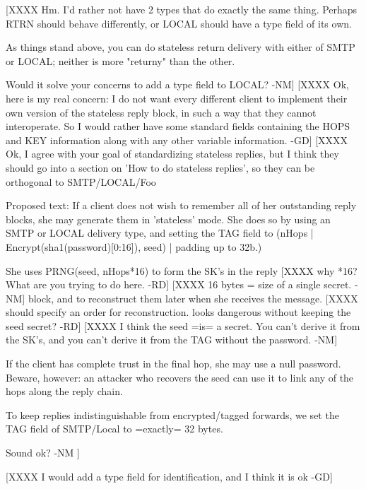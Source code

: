 [XXXX Hm.  I'd rather not have 2 types that do exactly the same thing.
      Perhaps RTRN should behave differently, or LOCAL should have a
      type field of its own.

      As things stand above, you can do stateless return delivery with
      either of SMTP or LOCAL; neither is more "returny" than the other.

      Would it solve your concerns to add a type field to LOCAL? -NM]
[XXXX Ok, here is my real concern: I do not want every different client
      to implement their own version of the stateless reply block, in
such a way that they cannot interoperate. So I would rather have some 
standard fields containing the HOPS and KEY information along with any
other variable information. -GD]
[XXXX Ok, I agree with your goal of standardizing stateless replies,
      but I think they should go into a section on 'How to do
      stateless replies', so they can be orthogonal to SMTP/LOCAL/Foo  

      Proposed text:
         If a client does not wish to remember all of her outstanding
         reply blocks, she may generate them in 'stateless' mode.  She  
         does so by using an SMTP or LOCAL delivery type, and setting
         the TAG field to 
           (nHops | Encrypt(sha1(password)[0:16]), seed) | padding up to 32b.)

         She uses PRNG(seed, nHops*16) to form the SK's in the reply
[XXXX why *16? What are you trying to do here. -RD]
[XXXX 16 bytes = size of a single secret. -NM]
         block, and to reconstruct them later when she receives the 
         message.
[XXXX should specify an order for reconstruction. looks dangerous
  without keeping the seed secret? -RD]
[XXXX I think the seed =is= a secret.  You can't derive it from the
  SK's, and you can't derive it from the TAG without the password. -NM]
       
         If the client has complete trust in the final hop, she may
         use a null password.  Beware, however: an attacker who recovers 
         the seed can use it to link any of the hops along the reply 
         chain.

	 To keep replies indistinguishable from encrypted/tagged
         forwards, we set the TAG field of SMTP/Local to =exactly=
         32 bytes.

         Sound ok?                                 -NM ]

[XXXX I would add a type field for identification, and I think it is
ok -GD]

